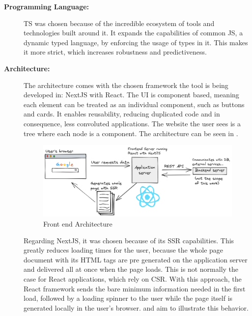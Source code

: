 \begin{description}
  \item[\textbf{Programming Language:}] \ac{TS} was chosen because of the incredible ecosystem of tools and technologies built around it. It expands the capabilities of common \ac{JS}, a dynamic typed language, by enforcing the usage of types in it. This makes it more strict, which increases robustness and predictiveness.
  \item[\textbf{Architecture:}] The architecture comes with the chosen framework the tool is being developed in: NextJS with React. The \ac{UI} is component based, meaning each element can be treated as an individual component, such as buttons and cards. It enables reusability, reducing duplicated code and in consequence, less convoluted applications. The website the user sees is a tree where each node is a component. The architecture can be seen in .

    \begin{figure}[!htb]
      \caption{Front end Architecture}\label{fig:arch}
      \begin{center}
        \includegraphics[width=14cm]{img/6-architecture.png}
      \end{center}
    \end{figure}

    Regarding NextJS, it was chosen because of its \ac{SSR} capabilities. This greatly reduces loading times for the user, because the whole page document with its \ac{HTML} tags are pre generated on the application server and delivered all at once when the page loads. This is not normally the case for React applications, which rely on \ac{CSR}. With this approach, the React framework sends the bare minimum information needed in the first load, followed by a loading spinner to the user while the page itself is generated locally in the user's browser.  and  aim to illustrate this behavior.


\end{description}
